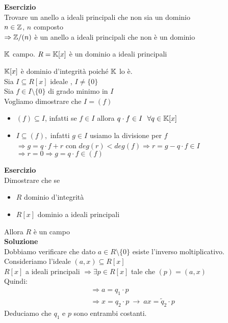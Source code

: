 \documentclass{article}
\begin{document}
\textbf{Esercizio}\\
Trovare un anello a ideali principali che non sia un dominio\\
$n\in\mathbb{Z}$,  $n$ composto\\
$ \Rightarrow \mathbb{Z}/(n)$ è un anello a ideali principali che non è un dominio
\begin{prop}
	$\mathbb{K}$ campo. $R = \mathbb{K}[x]$ è un dominio a ideali principali
\end{prop}
\begin{dimo}
	$\mathbb{K}[x]$ è dominio d'integrità poiché $\mathbb{K}$ lo è.\\
	Sia $I\subseteq R[x]$ ideale ,  $I\neq \{0\}$\\
	Sia $f\in I\setminus\{0\}$ di grado minimo in  $I$\\
	Vogliamo dimostrare che  $I = (f)$
	 \begin{itemize}
		 \item $(f) \subseteq I$, infatti se $f\in I$ allora $q\cdot f\in I \ \ \forall q\in \mathbb{K}[x]$
		 \item  $I\subseteq (f),$ infatti $g\in I$ usiamo la divisione per  $f$\\
			  $ \Rightarrow g = q\cdot f + r$ con $deg(r) < deg(f) \Rightarrow r = g - q\cdot f \in I$ \\
			  $ \Rightarrow r =0 \Rightarrow g = q\cdot f\in (f)$
	\end{itemize}

\end{dimo}
\textbf{Esercizio}\\
Dimostrare che se
\begin{itemize}
	\item $R$ dominio d'integrità
	\item $R[x]$ dominio a ideali principali
\end{itemize}
Allora $R$ è un campo\\
\textbf{Soluzione}\\
Dobbiamo verificare che dato $a\in R\setminus\{0\}$ esiste l'inverso moltiplicativo.\\
Consideriamo l'ideale $(a,x)\subseteq R[x]$\\
$R[x]$ a ideali principali $ \Rightarrow \exists p\in R[x]$ tale che $(p) = (a,x)$\\
Quindi:
\begin{gather*}
	\Rightarrow a = q_1\cdot p\\
	 \Rightarrow x = q_2\cdot p \ \rightarrow \ ax = \tilde q_2\cdot p
\end{gather*}
Deduciamo che $q_1$ e $p$ sono entrambi costanti.\\
\end{document}
